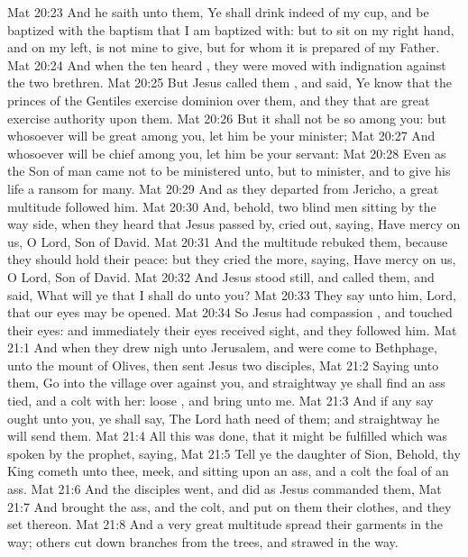 \vs Mat 20:23 And he saith unto them, Ye shall drink indeed of my cup, and be baptized with the baptism that I am baptized with: but to sit on my right hand, and on my left, is not mine to give, but  for whom it is prepared of my Father.
\vs Mat 20:24 And when the ten heard , they were moved with indignation against the two brethren.
\vs Mat 20:25 But Jesus called them , and said, Ye know that the princes of the Gentiles exercise dominion over them, and they that are great exercise authority upon them.
\vs Mat 20:26 But it shall not be so among you: but whosoever will be great among you, let him be your minister;
\vs Mat 20:27 And whosoever will be chief among you, let him be your servant:
\vs Mat 20:28 Even as the Son of man came not to be ministered unto, but to minister, and to give his life a ransom for many.
\vs Mat 20:29 And as they departed from Jericho, a great multitude followed him.
\vs Mat 20:30 And, behold, two blind men sitting by the way side, when they heard that Jesus passed by, cried out, saying, Have mercy on us, O Lord,  Son of David.
\vs Mat 20:31 And the multitude rebuked them, because they should hold their peace: but they cried the more, saying, Have mercy on us, O Lord,  Son of David.
\vs Mat 20:32 And Jesus stood still, and called them, and said, What will ye that I shall do unto you?
\vs Mat 20:33 They say unto him, Lord, that our eyes may be opened.
\vs Mat 20:34 So Jesus had compassion , and touched their eyes: and immediately their eyes received sight, and they followed him.
\vs Mat 21:1 And when they drew nigh unto Jerusalem, and were come to Bethphage, unto the mount of Olives, then sent Jesus two disciples,
\vs Mat 21:2 Saying unto them, Go into the village over against you, and straightway ye shall find an ass tied, and a colt with her: loose , and bring  unto me.
\vs Mat 21:3 And if any  say ought unto you, ye shall say, The Lord hath need of them; and straightway he will send them.
\vs Mat 21:4 All this was done, that it might be fulfilled which was spoken by the prophet, saying,
\vs Mat 21:5 Tell ye the daughter of Sion, Behold, thy King cometh unto thee, meek, and sitting upon an ass, and a colt the foal of an ass.
\vs Mat 21:6 And the disciples went, and did as Jesus commanded them,
\vs Mat 21:7 And brought the ass, and the colt, and put on them their clothes, and they set  thereon.
\vs Mat 21:8 And a very great multitude spread their garments in the way; others cut down branches from the trees, and strawed  in the way.
